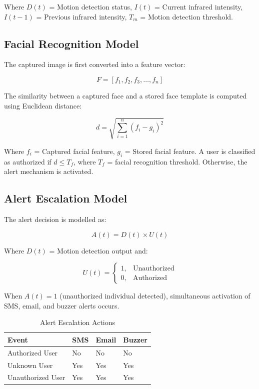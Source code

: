 \documentclass[12pt,a4paper,oneside]{report}
\begin{document}
Where $D(t)$ = Motion detection status, $I(t)$ = Current infrared intensity, $I(t-1)$ = Previous infrared intensity, $T_m$ = Motion detection threshold.

\subsection{Facial Recognition Model}

The captured image is first converted into a feature vector:

\begin{equation}
  F = [f_1, f_2, f_3, \ldots, f_n]
\end{equation}

The similarity between a captured face and a stored face template is computed using Euclidean distance:

\begin{equation}
  d = \sqrt{\sum_{i=1}^{n}(f_i - g_i)^2}
\end{equation}

Where $f_i$ = Captured facial feature, $g_i$ = Stored facial feature. A user is classified as authorized if $d \leq T_f$, where $T_f$ = facial recognition threshold. Otherwise, the alert mechanism is activated.

\subsection{Alert Escalation Model}

The alert decision is modelled as:

\begin{equation}
  A(t) = D(t) \times U(t)
\end{equation}

Where $D(t)$ = Motion detection output and:

\begin{equation}
  U(t) = \begin{cases} 1, & \text{Unauthorized} \\ 0, & \text{Authorized} \end{cases}
\end{equation}

When $A(t) = 1$ (unauthorized individual detected), simultaneous activation of SMS, email, and buzzer alerts occurs.

\begin{table}[htbp]
  \centering
  \caption{Alert Escalation Actions}
  {\small
  \begin{tabular}{|p{5.00cm}|p{2.50cm}|p{2.50cm}|p{2.50cm}|}
    \hline
    \textbf{Event} & \textbf{SMS} & \textbf{Email} & \textbf{Buzzer} \\
    \hline
    Authorized User   & No  & No  & No \\
    Unknown User      & Yes & Yes & Yes \\
    Unauthorized User & Yes & Yes & Yes \\
    \hline
  \end{tabular}
  }
\end{table}
\end{document}
